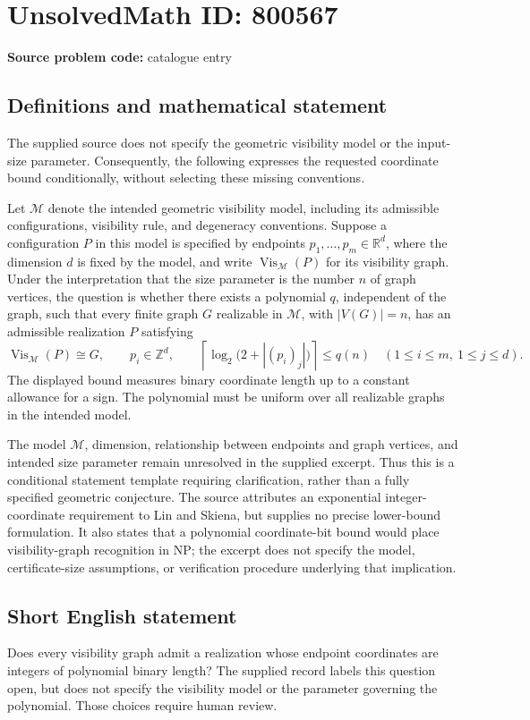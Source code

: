 \documentclass[11pt]{article}
\newcommand{\Z}{\mathbb{Z}}
\newcommand{\R}{\mathbb{R}}
\begin{document}
\section*{UnsolvedMath ID: 800567}
\textbf{Source problem code:} catalogue entry
\subsection{Definitions and mathematical statement}
The supplied source does not specify the geometric visibility model or the input-size parameter. Consequently, the following expresses the requested coordinate bound conditionally, without selecting these missing conventions.

Let \(\mathcal M\) denote the intended geometric visibility model, including its admissible configurations, visibility rule, and degeneracy conventions. Suppose a configuration \(P\) in this model is specified by endpoints \(p_1,\ldots,p_m\in\R^d\), where the dimension \(d\) is fixed by the model, and write \(\operatorname{Vis}_{\mathcal M}(P)\) for its visibility graph. Under the interpretation that the size parameter is the number \(n\) of graph vertices, the question is whether there exists a polynomial \(q\), independent of the graph, such that every finite graph \(G\) realizable in \(\mathcal M\), with \(|V(G)|=n\), has an admissible realization \(P\) satisfying
\[
\operatorname{Vis}_{\mathcal M}(P)\cong G,\qquad
p_i\in\Z^d,\qquad
\left\lceil\log_2\bigl(2+|(p_i)_j|\bigr)\right\rceil\le q(n)
\quad(1\le i\le m,\ 1\le j\le d).
\]
The displayed bound measures binary coordinate length up to a constant allowance for a sign. The polynomial must be uniform over all realizable graphs in the intended model.

The model \(\mathcal M\), dimension, relationship between endpoints and graph vertices, and intended size parameter remain unresolved in the supplied excerpt. Thus this is a conditional statement template requiring clarification, rather than a fully specified geometric conjecture. The source attributes an exponential integer-coordinate requirement to Lin and Skiena, but supplies no precise lower-bound formulation. It also states that a polynomial coordinate-bit bound would place visibility-graph recognition in \(\mathrm{NP}\); the excerpt does not specify the model, certificate-size assumptions, or verification procedure underlying that implication.
\subsection{Short English statement}
Does every visibility graph admit a realization whose endpoint coordinates are integers of polynomial binary length? The supplied record labels this question open, but does not specify the visibility model or the parameter governing the polynomial. Those choices require human review.
\end{document}
